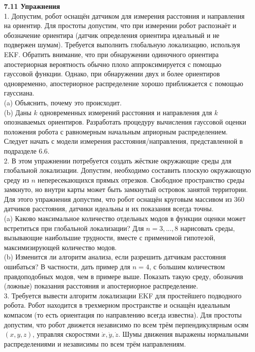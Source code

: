 \documentclass[10pt,a4paper]{article}
\begin{document}
\textbf{7.11 Упражнения}\\

1. Допустим, робот оснащён датчиком для измерения расстояния и направления на ориентир. Для простоты допустим, что при измерении робот распознаёт  и обозначение ориентира (датчик определения ориентира идеальный и не подвержен шумам). Требуется выполнить глобальную локализацию, используя EKF. Обратить внимание, что при обнаружении одиночного ориентира апостериорная вероятность обычно плохо аппроксимируется с помощью гауссовой функции. Однако, при обнаружении двух и более ориентиров одновременно, апостериорное распределение хорошо приближается с помощью гауссиана.\\

(a) Объяснить, почему это происходит.\\

(b) Даны $k$ одновременных измерений расстояния и направления для $k$ опознаваемых ориентиров. Разработать процедуру вычисления гауссовой оценки положения робота с равномерным начальным априорным распределением. Следует начать с модели измерения расстояния/направления, представленной в подразделе 6.6.\\

2. В этом упражнении потребуется создать жёсткие окружающие среды для глобальной локализации. Допустим, необходимо составить плоскую окружающую среду из $n$ непересекающихся прямых отрезков. Свободное пространство среды замкнуто, но внутри карты может быть замкнутый островок занятой территории. Для этого упражнения допустим, что робот оснащён круговым массивом из 360 датчиков расстояния, датчики идеальны и их показания всегда точны.\\

(a) Каково максимальное количество отдельных модов в функции оценки может встретиться при глобальной локализации? Для $n = 3, . . . , 8$ нарисовать среды, вызывающие наибольшие трудности, вместе с применимой гипотезой, максимизирующей количество модов.\\

(b) Изменится ли алгоритм анализа, если разрешить датчикам расстояния ошибаться? В частности, дать пример для $n = 4$, с большим количеством  правдоподобных модов, чем в примере выше. Показать такую среду, обозначив (ложные) показания расстояния и апостериорное распределение.\\ 
3. Требуется вывести алгоритм локализации EKF для простейшего подводного робота. Робот находится в трехмерном пространстве и оснащён идеальным компасом (то есть ориентация по направлению всегда известна). Для простоты допустим, что робот движется независимо по всем трём перпендикулярным осям $(x, y, z)$, управляя скоростями $\dot{x},\dot{y},\dot{z}$. Шумы движения выражены нормальными распределениями и независимы по всем трём направлениям.
\end{document}
